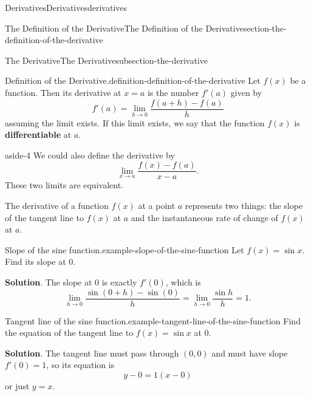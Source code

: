 \documentclass[oneside,10pt,]{book}
\newcommand{\terminology}[1]{\textbf{#1}}
\numberwithin{equation}{section}
\begin{document}
\begin{chapterptx}{Derivatives}{}{Derivatives}{}{}{derivatives}
\begin{sectionptx}{The Definition of the Derivative}{}{The Definition of the Derivative}{}{}{section-the-definition-of-the-derivative}
\begin{subsectionptx}{The Derivative}{}{The Derivative}{}{}{subsection-the-derivative}
\begin{definition}{Definition of the Derivative.}{definition-definition-of-the-derivative}%
\hypertarget{p-93}{}%
Let \(f(x)\) be a function. Then its derivative at \(x=a\) is the number \(f'(a)\) given by%
\begin{equation*}
f'(a) = \lim_{h\to0}\frac{f(a+h)-f(a)}{h}
\end{equation*}
assuming the limit exists. If this limit exists, we say that the function \(f(x)\) is \terminology{differentiable} at \(a\).%
\end{definition}
\begin{aside}{}{aside-4}%
\hypertarget{p-94}{}%
We could also define the derivative by%
\begin{equation*}
\lim_{x\to a}\frac{f(x)-f(a)}{x-a}.
\end{equation*}
These two limits are equivalent.%
\end{aside}
\hypertarget{p-95}{}%
The derivative of a function \(f(x)\) at a point \(a\) represents two things: the slope of the tangent line to \(f(x)\) at \(a\) and the instantaneous rate of change of \(f(x)\) at \(a\).%
\begin{example}{Slope of the sine function.}{example-slope-of-the-sine-function}%
\hypertarget{p-96}{}%
Let \(f(x) = \sin x\). Find its slope at \(0\).%
\par\smallskip%
\noindent\textbf{Solution}.\hypertarget{solution-20}{}\quad%
\hypertarget{p-97}{}%
The slope at \(0\) is exactly \(f'(0)\), which is%
\begin{equation*}
\lim_{h\to0}\frac{\sin(0+h)-\sin(0)}{h} = \lim_{h\to0}\frac{\sin h}{h} = 1.
\end{equation*}
%
\end{example}
\begin{example}{Tangent line of the sine function.}{example-tangent-line-of-the-sine-function}%
\hypertarget{p-98}{}%
Find the equation of the tangent line to \(f(x) = \sin x\) at \(0\).%
\par\smallskip%
\noindent\textbf{Solution}.\hypertarget{solution-21}{}\quad%
\hypertarget{p-99}{}%
The tangent line must pass through \((0,0)\) and must have slope \(f'(0) = 1\), so its equation is%
\begin{equation*}
y-0 = 1(x-0)
\end{equation*}
or just \(y=x\).%
\end{example}
\end{subsectionptx}
\end{sectionptx}

\end{chapterptx}
\end{document}
